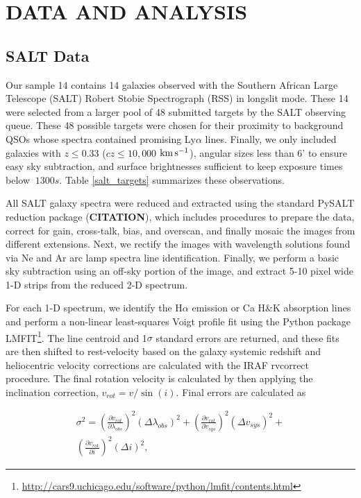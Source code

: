 \documentclass[iop]{emulateapj-rtx4}
\newcommand{\kms}{$\rm km\, s^{-1}$}
\begin{document}
\section{DATA AND ANALYSIS}

\subsection{SALT Data}
Our sample 14 contains 14 galaxies observed with the Southern African Large Telescope (SALT) Robert Stobie Spectrograph (RSS) in longslit mode. These 14 were selected from a larger pool of 48 submitted targets by the SALT observing queue. These 48 possible targets were chosen for their proximity to background QSOs whose spectra contained promising Ly$\alpha$ lines. Finally, we only included galaxies with $z \leq 0.33$ ($cz \leq 10,000$ \kms), angular sizes less than 6' to ensure easy sky subtraction, and surface brightnesses sufficient to keep exposure times below $~1300 s$. Table \ref{salt_targets} summarizes these observations.



All SALT galaxy spectra were reduced and extracted using the standard PySALT reduction package (\textbf{CITATION}), which includes procedures to prepare the data, correct for gain, cross-talk, bias, and overscan, and finally mosaic the images from different extensions. Next, we rectify the images with wavelength solutions found via Ne and Ar arc lamp spectra line identification. Finally, we perform a basic sky subtraction using an off-sky portion of the image, and extract 5-10 pixel wide 1-D strips from the reduced 2-D spectrum. 

For each 1-D spectrum, we identify the H$\alpha$ emission or Ca H\&K absorption lines and perform a non-linear least-squares Voigt profile fit using the Python package LMFIT\footnote{\url{http://cars9.uchicago.edu/software/python/lmfit/contents.html}}. The line centroid and 1$\sigma$ standard errors are returned, and these fits are then shifted to rest-velocity based on the galaxy systemic redshift and heliocentric velocity corrections are calculated with the IRAF rvcorrect procedure. The final rotation velocity is calculated by then applying the inclination correction, $v_{rot} = v / \sin(i)$. Final errors are calculated as

\begin{equation}
\begin{split}
	\sigma^2 = \left( \frac{\partial v_{rot}}{\partial \lambda_{obs}} \right)^2 (\Delta \lambda_{obs})^2 + \left(\frac{\partial v_{rot}}{\partial v_{sys}} \right)^2 (\Delta v_{sys})^2 + \\
	\left( \frac{\partial v_{rot}}{\partial i} \right)^2 (\Delta i)^2,
\end{split}
\end{equation}
\end{document}
